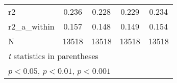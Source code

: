 {\begin{tabular}{l*{4}{c}}
\hline
r2          &       0.236         &       0.228         &       0.229         &       0.234         \\
r2\_a\_within &       0.157         &       0.148         &       0.149         &       0.154         \\
N           &       13518         &       13518         &       13518         &       13518         \\
\hline\hline
\multicolumn{5}{l}{\footnotesize \textit{t} statistics in parentheses}\\
\multicolumn{5}{l}{\footnotesize \sym{*} \(p<0.05\), \sym{**} \(p<0.01\), \sym{***} \(p<0.001\)}\\
\end{tabular}
}
